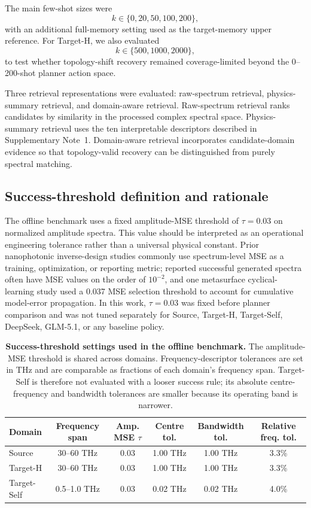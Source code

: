 \documentclass[final,1p,times]{elsarticle}
\begin{document}
The main few-shot sizes were
\[
k \in \{0,20,50,100,200\},
\]
with an additional full-memory setting used as the target-memory upper reference. For Target-H, we also evaluated
\[
k \in \{500,1000,2000\},
\]
to test whether topology-shift recovery remained coverage-limited beyond the 0--200-shot planner action space.

Three retrieval representations were evaluated: raw-spectrum retrieval, physics-summary retrieval, and domain-aware retrieval. Raw-spectrum retrieval ranks candidates by similarity in the processed complex spectral space. Physics-summary retrieval uses the ten interpretable descriptors described in Supplementary Note~1. Domain-aware retrieval incorporates candidate-domain evidence so that topology-valid recovery can be distinguished from purely spectral matching.

\subsection{Success-threshold definition and rationale}

The offline benchmark uses a fixed amplitude-MSE threshold of $\tau=0.03$ on normalized amplitude spectra. This value should be interpreted as an operational engineering tolerance rather than a universal physical constant. Prior nanophotonic inverse-design studies commonly use spectrum-level MSE as a training, optimization, or reporting metric; reported successful generated spectra often have MSE values on the order of $10^{-2}$, and one metasurface cyclical-learning study used a 0.037 MSE selection threshold to account for cumulative model-error propagation. In this work, $\tau=0.03$ was fixed before planner comparison and was not tuned separately for Source, Target-H, Target-Self, DeepSeek, GLM-5.1, or any baseline policy.

\begin{table}[htbp!]
\centering
\caption{\textbf{Success-threshold settings used in the offline benchmark.}
The amplitude-MSE threshold is shared across domains. Frequency-descriptor tolerances are set in THz and are comparable as fractions of each domain's frequency span. Target-Self is therefore not evaluated with a looser success rule; its absolute centre-frequency and bandwidth tolerances are smaller because its operating band is narrower.}
\label{tab:si_threshold_definition}
\footnotesize
\setlength{\tabcolsep}{4.2pt}
\renewcommand{\arraystretch}{1.12}
\begin{tabular}{lccccc}
\toprule
Domain & Frequency span & Amp. MSE $\tau$ & Centre tol. & Bandwidth tol. & Relative freq. tol. \\
\midrule
Source & 30--60 THz & 0.03 & 1.00 THz & 1.00 THz & 3.3\% \\
Target-H & 30--60 THz & 0.03 & 1.00 THz & 1.00 THz & 3.3\% \\
Target-Self & 0.5--1.0 THz & 0.03 & 0.02 THz & 0.02 THz & 4.0\% \\
\bottomrule
\end{tabular}
\end{table}
\end{document}
